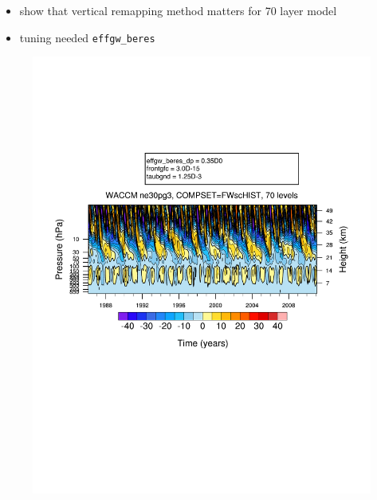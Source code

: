 \documentclass[draft]{agujournal2019}
\begin{document}
\begin{itemize}
\item show that vertical remapping method matters for 70 layer model
\item tuning needed \verb+effgw_beres+
\end{itemize}
\begin{figure}
\noindent\includegraphics[width=\textwidth]{figs/FWscHIST-nlev70.pdf}

\end{figure}
\end{document}
